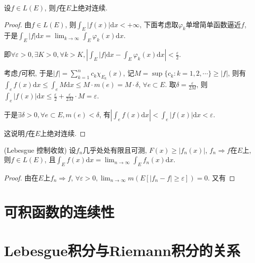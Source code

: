 \documentclass[theorem=false,mathfont=none,openany,sub3section]{easybook}
\begin{document}
\begin{theorem}
  设$f\in L(E)$, 则$f$在$E$上绝对连续.\par
\end{theorem}

\begin{proof}
  由$f\in L(E)$, 则$\int_{E}|f(x)|\mathrm{d}x<+\infty$, 下面考虑取${\varphi_k}$单增简单函数逼近$f$, 于是$\int_{E}|f|\mathrm{d}x=\lim_{k \to \infty}\int_{E}\varphi_k(x)\mathrm{d}x$.\par
  即$\forall \varepsilon >0, \exists K>0, \forall k>K, \left|\int_{E}|f|\mathrm{d}x-\int_{E}\varphi_k(x)\mathrm{d}x\right|<\frac{\varepsilon}{2}$.\par
  考虑$f$可积, 于是$|f|=\sum_{k=1}^{n}c_k\chi_{E_k}(x)$, 记$M=\sup \{c_k:k=1,2,\cdots\}\geqslant |f|$, 则有$\int_{e}f(x)\mathrm{d}x\leqslant \int_{e}M\mathrm{d}x\leqslant M\cdot m(e) = M\cdot \delta$, $\forall e\subset E$.
  取$\delta = \frac{\varepsilon}{2M}$, 则$\int_{e}|f(x)|\mathrm{d}x\leqslant \frac{\varepsilon}{2}+\frac{\varepsilon}{2M}\cdot M=\varepsilon$.\par
  于是$ \exists \delta >0, \forall e\subset E, m(e)<\delta$, 有$\left|\int_{e}f(x)\mathrm{d}x\right|<\int_{e}\left|f(x)\right|\mathrm{d}x<\varepsilon$.\par
  这说明$f$在$E$上绝对连续.\par
\end{proof}

\begin{theorem}
  (Lebesgue 控制收敛) 设$f_n$几乎处处有限且可测, $F(x)\geqslant |f_n(x)|$, $f_n\Rightarrow f$在$E$上, 则$f\in L(E)$, 且$\int_{E}f(x)\mathrm{d}x=\lim_{n\to \infty} \int_{E}f_n(x)\mathrm{d}x$.\par
\end{theorem}

\begin{proof}
  由在$E$上$f_n\Rightarrow f$, $\forall \varepsilon >0, \lim_{n \to \infty}m(E[|f_n-f|\geqslant \varepsilon])=0$. 又有
\end{proof}

\newpage

\section{可积函数的连续性}


\newpage

\section{Lebesgue积分与Riemann积分的关系}
\end{document}
